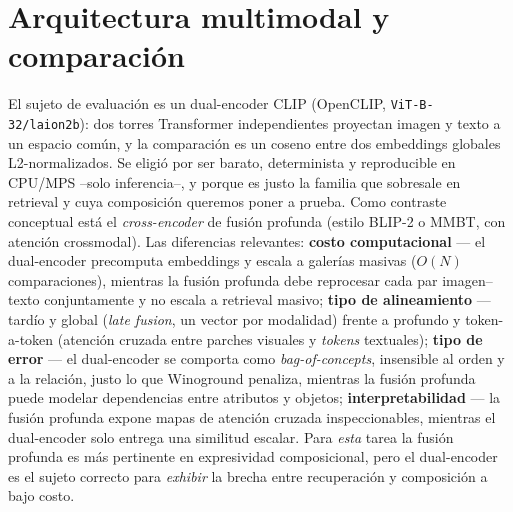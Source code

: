 \documentclass[10pt,a4paper]{article}
\begin{document}
\section{Arquitectura multimodal y comparación}
El sujeto de evaluación es un dual-encoder CLIP (OpenCLIP, \texttt{ViT-B-32/laion2b}): dos torres
Transformer independientes proyectan imagen y texto a un espacio común, y la comparación es un
coseno entre dos embeddings globales L2-normalizados. Se eligió por ser barato, determinista y
reproducible en CPU/MPS --solo inferencia--, y porque es justo la familia que sobresale en
retrieval y cuya composición queremos poner a prueba. Como contraste conceptual está el
\emph{cross-encoder} de fusión profunda (estilo BLIP-2 o MMBT, con atención crossmodal). Las
diferencias relevantes: \textbf{costo computacional} --- el dual-encoder precomputa embeddings y
escala a galerías masivas ($O(N)$ comparaciones), mientras la fusión profunda debe reprocesar
cada par imagen--texto conjuntamente y no escala a retrieval masivo; \textbf{tipo de alineamiento}
--- tardío y global (\emph{late fusion}, un vector por modalidad) frente a profundo y token-a-token
(atención cruzada entre parches visuales y \emph{tokens} textuales); \textbf{tipo de error} --- el
dual-encoder se comporta como \emph{bag-of-concepts}, insensible al orden y a la relación, justo lo
que Winoground penaliza, mientras la fusión profunda puede modelar dependencias entre atributos y
objetos; \textbf{interpretabilidad} --- la fusión profunda expone mapas de atención cruzada
inspeccionables, mientras el dual-encoder solo entrega una similitud escalar. Para \emph{esta}
tarea la fusión profunda es más pertinente en expresividad composicional, pero el dual-encoder es
el sujeto correcto para \emph{exhibir} la brecha entre recuperación y composición a bajo costo.
\end{document}
